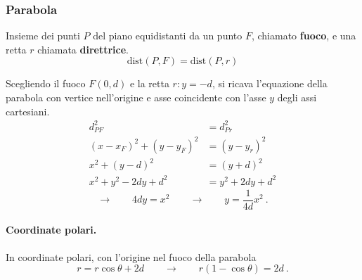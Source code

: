 \subsubsection{Parabola}
\begin{definition}[Parabola] Insieme dei punti $P$ del piano equidistanti da un punto $F$, chiamato \textbf{fuoco}, e una retta $r$ chiamata \textbf{direttrice}.
\begin{equation}
    \text{dist}(P,F) = \text{dist}(P,r) 
\end{equation}
\end{definition}
Scegliendo il fuoco $F(0, d)$ e la retta $r: y=-d$, si ricava l'equazione della parabola con vertice nell'origine e asse coincidente con l'asse $y$ degli assi cartesiani.
\begin{equation}
\begin{aligned}
    d^2_{PF} & = d^2_{Pr} \\
    (x - x_F)^2 + (y - y_F)^2 & = (y-y_r)^2 \\
    x^2 + (y - d)^2 & = (y+d)^2 \\
    x^2 + y^2 - 2dy + d^2 & = y^2 + 2dy + d^2 
\end{aligned}
\end{equation}
\begin{equation}
    \rightarrow \qquad 4d y = x^2 \qquad \rightarrow \qquad y = \dfrac{1}{4d} x^2 \ .
\end{equation}

\paragraph{Coordinate polari.} In coordinate polari, con l'origine nel fuoco della parabola
\begin{equation}
    r = r \cos \theta + 2d
\qquad \rightarrow \qquad
    r ( 1 - \cos \theta ) = 2d \ .
\end{equation}

